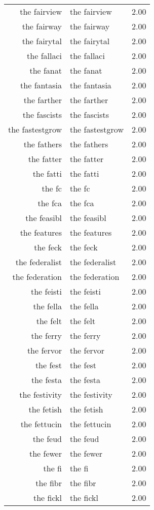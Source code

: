 \begin{table}[ht]
\begin{tabular}{rlr}
  the fairview & the fairview & 2.00 \\ 
  the fairway & the fairway & 2.00 \\ 
  the fairytal & the fairytal & 2.00 \\ 
  the fallaci & the fallaci & 2.00 \\ 
  the fanat & the fanat & 2.00 \\ 
  the fantasia & the fantasia & 2.00 \\ 
  the farther & the farther & 2.00 \\ 
  the fascists & the fascists & 2.00 \\ 
  the fastestgrow & the fastestgrow & 2.00 \\ 
  the fathers & the fathers & 2.00 \\ 
  the fatter & the fatter & 2.00 \\ 
  the fatti & the fatti & 2.00 \\ 
  the fc & the fc & 2.00 \\ 
  the fca & the fca & 2.00 \\ 
  the feasibl & the feasibl & 2.00 \\ 
  the features & the features & 2.00 \\ 
  the feck & the feck & 2.00 \\ 
  the federalist & the federalist & 2.00 \\ 
  the federation & the federation & 2.00 \\ 
  the feisti & the feisti & 2.00 \\ 
  the fella & the fella & 2.00 \\ 
  the felt & the felt & 2.00 \\ 
  the ferry & the ferry & 2.00 \\ 
  the fervor & the fervor & 2.00 \\ 
  the fest & the fest & 2.00 \\ 
  the festa & the festa & 2.00 \\ 
  the festivity & the festivity & 2.00 \\ 
  the fetish & the fetish & 2.00 \\ 
  the fettucin & the fettucin & 2.00 \\ 
  the feud & the feud & 2.00 \\ 
  the fewer & the fewer & 2.00 \\ 
  the fi & the fi & 2.00 \\ 
  the fibr & the fibr & 2.00 \\ 
  the fickl & the fickl & 2.00 \\ 

\end{tabular}
\end{table}
